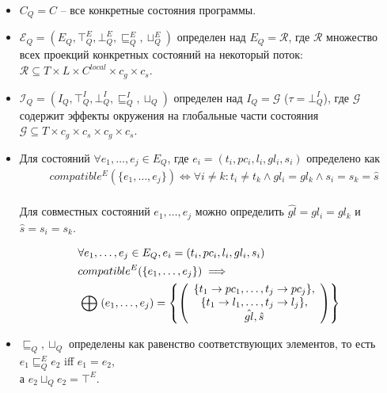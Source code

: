 \begin{itemize}
\item $C_Q=C$ -- все конкретные состояния программы.\\

\item $\mathcal{E}_Q=(E_Q, \top^E_Q, \bot^E_Q, \sqsubseteq^E_Q, \sqcup^E_Q)$ определен над $E_Q=\mathcal{R}$, где
$\mathcal{R}$ множество всех проекций конкретных состояний на некоторый поток:
$\mathcal{R} \subseteq T\times L\times C^{local} \times c_g \times c_s$.

\item $\mathcal{I}_Q=(I_Q, \top^I_Q, \bot^I_Q, \sqsubseteq^I_Q, \sqcup_Q)$ определен над $I_Q=\mathcal{G}$ ($\tau=\bot^I_Q$), где
$\mathcal{G}$ содержит эффекты окружения на глобальные части состояния
$\mathcal{G} \subseteq T\times c_g \times c_s \times c_g \times c_s$.

\item Для состояний $\forall e_1, \dots, e_j \in E_Q$, где $e_i=(t_i,pc_i,l_i,gl_i,s_i)$ определено как
\begin{equation}
\label{compatible_tm_na}
\begin{aligned}
& compatible^E(\{e_1, \dots, e_j\}) \Leftrightarrow \forall i\ne k:t_i\ne t_k \land gl_i=gl_k \land s_i=s_k=\hat s\\
\end{aligned}
\end{equation}

Для совместных состояний $e_1,\dots,e_j$ можно определить $\hat{gl}=gl_i=gl_k$ и $\hat s=s_i=s_k$.

\begin{equation}
\label{epp_tm_na}
\begin{aligned}
& \forall e_1, \dots, e_j \in E_Q, e_i=(t_i,pc_i,l_i,gl_i,s_i)\\
& compatible^E(\{e_1,\dots,e_j\}) \implies \\
& \mathrel{\bigoplus}(e_1,\dots,e_j) = 
\left\lbrace\left(
\begin{array}{c}
\{t_1 \to pc_1,\dots,t_j \to pc_j\},\\
\{t_1\to l_1, \dots, t_j\to l_j\},\\
\hat{gl}, \hat s
\end{array}
\right)\right\rbrace
\\
\end{aligned}
\end{equation}

\item $\sqsubseteq_Q, \sqcup_Q$ определены как равенство соответствующих элементов, то есть\\
$e_1 \sqsubseteq^E_Q e_2$ iff $e_1 = e_2$, \\
а $e_2 \sqcup_Q e_2 = \top^E$.

\end{itemize}

